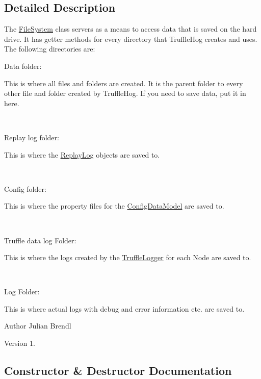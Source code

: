 \subsection{Detailed Description}
The \hyperlink{classedu_1_1kit_1_1trufflehog_1_1model_1_1_file_system}{File\+System} class servers as a means to access data that is saved on the hard drive. It has getter methods for every directory that Truffle\+Hog creates and uses. The following directories are\+: 
\begin{DoxyItemize}
\item Data folder\+: 

This is where all files and folders are created. It is the parent folder to every other file and folder created by Truffle\+Hog. If you need to save data, put it in here. 

~\newline
 
\item Replay log folder\+: 

This is where the \hyperlink{}{Replay\+Log} objects are saved to. 

~\newline
 
\item Config folder\+: 

This is where the property files for the \hyperlink{}{Config\+Data\+Model} are saved to. 

~\newline
 
\item Truffle data log Folder\+: 

This is where the logs created by the \hyperlink{}{Truffle\+Logger} for each Node are saved to. 

~\newline
 
\item Log Folder\+: 

This is where actual logs with debug and error information etc. are saved to. 


\end{DoxyItemize}

\begin{DoxyAuthor}{Author}
Julian Brendl 
\end{DoxyAuthor}
\begin{DoxyVersion}{Version}
1. 
\end{DoxyVersion}


\subsection{Constructor \& Destructor Documentation}
\hypertarget{classedu_1_1kit_1_1trufflehog_1_1model_1_1_file_system_adbc995de33c1ac9171e424abaa8d69d8}{}
